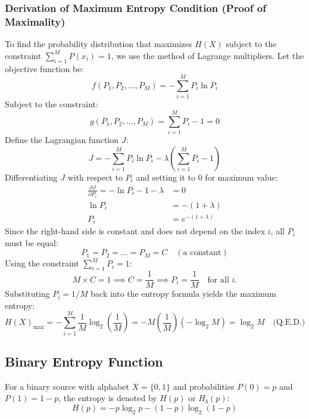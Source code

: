 \documentclass[12pt,a4paper]{article}
\begin{document}
\subsubsection{Derivation of Maximum Entropy Condition (Proof of Maximality)}
To find the probability distribution that maximizes $H(X)$ subject to the constraint $\sum_{i=1}^M P(x_i) = 1$, we use the method of Lagrange multipliers.
Let the objective function be:
\begin{equation*}
  f(P_1, P_2, \dots, P_M) = -\sum_{i=1}^M P_i \ln P_i
\end{equation*}
Subject to the constraint:
\begin{equation*}
  g(P_1, P_2, \dots, P_M) = \sum_{i=1}^M P_i - 1 = 0
\end{equation*}
Define the Lagrangian function $J$:
\begin{equation*}
  J = -\sum_{i=1}^M P_i \ln P_i - \lambda \left(\sum_{i=1}^M P_i - 1\right)
\end{equation*}
Differentiating $J$ with respect to $P_i$ and setting it to 0 for maximum value:
\begin{align*}
  \frac{\partial J}{\partial P_i} = - \ln P_i - 1 - \lambda &= 0 \\
  \ln P_i &= -(1 + \lambda) \\
  P_i &= e^{-(1+\lambda)}
\end{align*}
Since the right-hand side is constant and does not depend on the index $i$, all $P_i$ must be equal:
\begin{equation*}
  P_1 = P_2 = \dots = P_M = C \quad (\text{a constant})
\end{equation*}
Using the constraint $\sum_{i=1}^M P_i = 1$:
\begin{equation*}
  M \times C = 1 \implies C = \frac{1}{M} \implies P_i = \frac{1}{M} \quad \text{for all } i.
\end{equation*}
Substituting $P_i = 1/M$ back into the entropy formula yields the maximum entropy:
\begin{equation*}
  H(X)_{\text{max}} = -\sum_{i=1}^M \frac{1}{M} \log_2 \left(\frac{1}{M}\right) = -M \left(\frac{1}{M}\right) \left(-\log_2 M\right) = \log_2 M \quad \text{(Q.E.D.)}
\end{equation*}

\subsection{Binary Entropy Function}
For a binary source with alphabet $X = \{0, 1\}$ and probabilities $P(0) = p$ and $P(1) = 1-p$, the entropy is denoted by $H(p)$ or $H_b(p)$:
\begin{equation}
  H(p) = -p \log_2 p - (1-p) \log_2 (1-p)
\end{equation}
\end{document}

